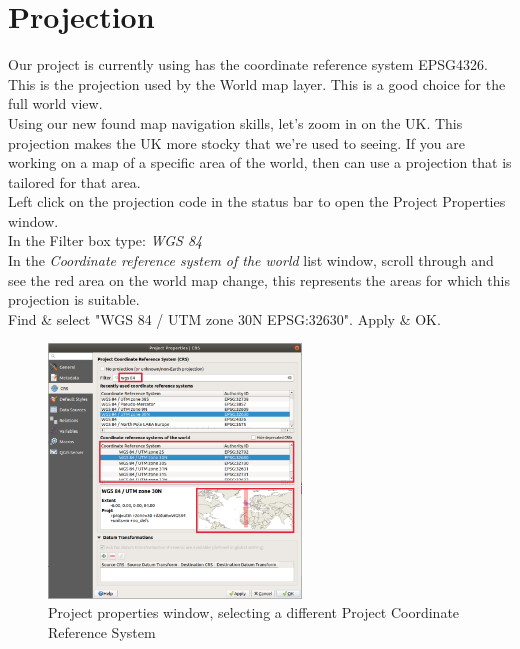\chapter{Projection}

\pagestyle{fancy}
\fancyhf{}
\fancyhead[OC]{\leftmark}
\fancyhead[EC]{\rightmark}
\cfoot{\thepage}


Our project is currently using has the coordinate reference system EPSG4326. This is the projection used by the World map layer. This is a good choice for the full world view.\\

Using our new found map navigation skills, let's zoom in on the UK. This projection makes the UK more stocky that we're used to seeing. If you are working on a map of a specific area of the world, then can use a projection that is tailored for that area.\\

Left click on the projection code in the status bar to open the Project Properties window.\\

In the Filter box type: \textit{WGS 84}\\

In the \textit{Coordinate reference system of the world} list window, scroll through and see the red area on the world map change, this represents the areas for which this projection is suitable.\\

Find \& select "WGS 84 / UTM zone 30N		 EPSG:32630". Apply \& OK.\\

\begin{figure}[!h]
	\centering
	\includegraphics[width=0.6\textwidth]{images/project_properties_window_crs.png}
	\caption{Project properties window, selecting a different Project Coordinate Reference System}
	\label{ft_fig_firstfig3}
\end{figure}


